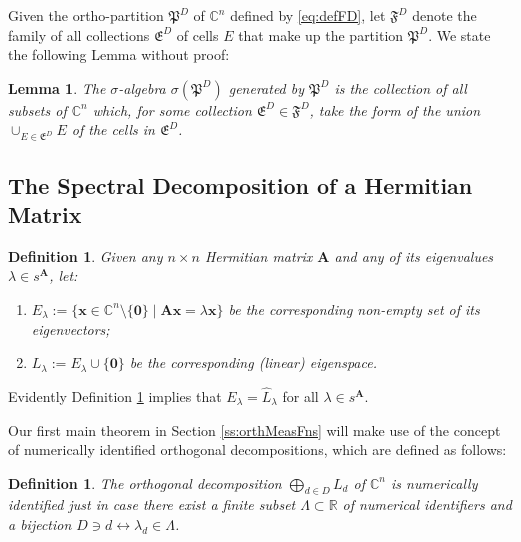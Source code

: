 \documentclass[11pt]{article}
\newcommand \R { \mathbb{R} }
\newcommand \C { \mathbb{C} }
\newtheorem{lemma}[theorem]{Lemma}
\newtheorem{definition}[theorem]{Definition}
\begin{document}
Given the ortho-partition $ \mathfrak P^D $ of $ \C^n $ defined by \eqref{eq:defFD}, 
let $ \mathfrak F^D $ denote the family of all collections $ \mathfrak E^D $ 
of cells $E$ that make up the partition $ \mathfrak P^D $.
We state the following Lemma without proof:   

\begin{lemma}
	The $ \sigma $-algebra $ \sigma ( \mathfrak P^D )$ generated by $ \mathfrak P^D $ 
	is the collection of all subsets of $ \C^n $ which, 
	for some collection $ \mathfrak E^D \in \mathfrak F^D $, take the form 
	of the union $ \cup _{E \in \mathfrak E^D } E$ of the cells in $ \mathfrak E^D $.
\end{lemma}

\subsection{The Spectral Decomposition of a Hermitian Matrix}

\begin{definition} \label{def:eigenpairs}
	Given any $n \times n$ Hermitian matrix $ \mathbf A$ 
	and any of its eigenvalues $ \lambda \in s^{ \mathbf A} $, let: 
\begin{enumerate}
	\item \( E_\lambda := \{ \mathbf x \in \C^n \setminus \{ \mathbf 0\} 
	\mid \mathbf A \mathbf x = \lambda \mathbf x \} \)
	be the corresponding non-empty set of its eigenvectors;
	\item \( L_\lambda := E_\lambda \cup \{ \mathbf 0\} \) 
	be the corresponding (linear) \emph{eigenspace}.
\end{enumerate}
\end{definition}

Evidently Definition \ref{def:eigenpairs} implies that $ E_\lambda = \hat L_\lambda $
for all $ \lambda \in s^{ \mathbf A} $.

Our first main theorem in Section \ref{ss:orthMeasFns} will make use of the concept
of numerically identified orthogonal decompositions, which are defined as follows:

\begin{definition} \label{def:numLabelledOrthDecomp}
	The orthogonal decomposition $ \bigoplus _{d \in D} L_d $ of $ \C^n $ 
	is \emph{numerically identified} just in case 
	there exist a finite subset $ \Lambda \subset \R$ of numerical identifiers
	and a bijection $D \owns d \longleftrightarrow \lambda _d \in \Lambda $. 
\end{definition}
\end{document}
